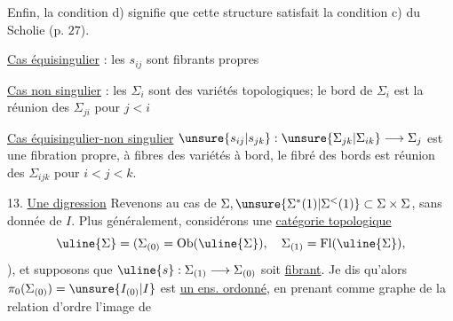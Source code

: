 Enfin, la condition d) signifie que cette structure
satisfait la condition c) du Scholie (p. $27$).

\uline{Cas équisingulier} : les $s_{ij}$ sont fibrants propres

\uline{Cas non singulier} : les $\Sigma_i$ sont des variétés
topologiques; le bord de $\Sigma_i$ est la réunion
des $\Sigma_{ji}$ pour $j<i$ 

\uline{Cas équisingulier-non singulier}
$\unsure{s_{ij}|s_{jk}}:\unsure{\Sigma_{jk}|\Sigma_{ik}}\longrightarrow\Sigma_j$ est
une fibration propre, à fibres des variétés
à bord, le fibré des bords est réunion
des $\Sigma_{ijk}$ pour $i<j<k$.

13. \uline{Une digression} Revenons au cas de
$\Sigma,\unsure{\Sigma^{*}(1)|\Sigma^{<}(1)}\subset\Sigma\times\Sigma$, sans donnée de $I$. Plus
généralement, considérons une \uline{catégorie topologique}
\[
\uline{\Sigma}=(\Sigma_{(0)}=\operatorname{Ob}(\uline{\Sigma}),\quad\Sigma_{(1)}=\operatorname{Fl}(\uline{\Sigma}),
\]
), et supposons
que $\uline{s}:\Sigma_{(1)}\longrightarrow\Sigma_{(0)}$ soit \uline{fibrant}. Je dis
qu'alors $\pi_0(\Sigma_{(0)})=\unsure{I_{(0)}|I}$ est \uline{un ens. ordonné},
en prenant comme graphe de la relation
d'ordre l'image de

